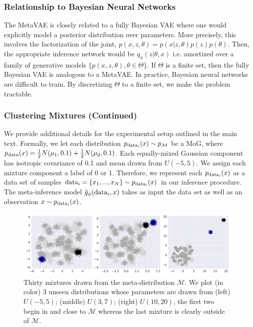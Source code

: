 \subsubsection{Relationship to Bayesian Neural Networks}
The MetaVAE is closely related to a fully Bayesian VAE where one would explicitly model a posterior distribution over parameters. More precisely, this involves the factorization of the joint, $p(x,z,\theta) = p(x|z,\theta)p(z)p(\theta)$. Then, the appropriate inference network would be $q_\phi(z|\theta, x)$ i.e. amortized over a family of generative models $\{p(x,z,\theta), \theta \in \Theta\}$. If $\Theta$ is a finite set, then the fully Bayesian VAE is analogous to a MetaVAE. In practice, Bayesian neural networks are difficult to train. By discretizing $\Theta$ to a finite set, we make the problem tractable.

\subsubsection{Clustering Mixtures (Continued)}
We provide additional details for the experimental setup outlined in the main text. Formally, we let each distribution $p_{\textup{data}_i}(x) \sim p_\mathcal{M}$ be a MoG, where $p_{\textup{data}}(x) = \frac{1}{2}N(\mathbf{\mu}_1, 0.1) + \frac{1}{2}N(\mathbf{\mu}_2, 0.1)$. Each equally-mixed Gaussian component has isotropic covariance of 0.1 and mean drawn from $U(-5, 5)$. We assign each mixture component a label of 0 or 1. 
Therefore, we represent each $p_{\textup{data}_i}(x)$ as a data set of samples $\textup{data}_i = \{x_1, ..., x_N\} \sim p_{\textup{data}_i}(x)$ in our inference procedure. 
The meta-inference model $\hat{g}_\phi(\textup{data}_i, x)$ takes as input the data set as well as an observation $x \sim  p_{\textup{data}_i}(x)$.

\begin{figure}[h!]
\includegraphics[width=\linewidth]{images/chapter5/mixtures/generalization_schemes.png}
\caption{Thirty mixtures drawn from the meta-distribution $\mathcal{M}$. We plot (in color) 3 unseen distributions whose parameters are drawn from (left) $U(-5, 5)$; (middle) $U(3,7)$; (right) $U(10, 20)$, the first two begin in and close to $\mathcal{M}$ whereas the last mixture is clearly outside of $\mathcal{M}$.}
\label{fig:mnist:gen}
\end{figure}

